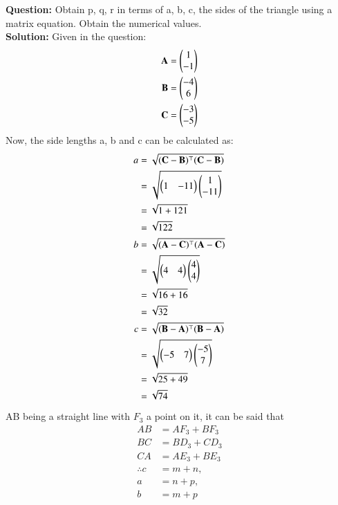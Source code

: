 \documentclass[journal,12pt,twocolumn]{IEEEtran}
\theoremstyle{remark}
\begin{document}
%
\textbf{Question:}
Obtain p, q, r in terms of a, b, c, the sides of the triangle using a matrix
equation. Obtain the numerical values.\\
\fi
\textbf{Solution:}
Given in the question:
\begin{align}
    \mathbf{A} &= \begin{pmatrix} 1 \\ -1 \end{pmatrix}\\
    \mathbf{B} &= \begin{pmatrix} -4 \\ 6 \end{pmatrix}\\
    \mathbf{C} &= \begin{pmatrix} -3 \\ -5 \end{pmatrix} 
\end{align}
Now, the side lengths a, b and c can be calculated as:
\begin{align}
    a &= \sqrt{(\mathbf{C}-\mathbf{B})^{\top}(\mathbf{C}-\mathbf{B})}\\
    &= \sqrt{\begin{pmatrix}1&-11\end{pmatrix} \begin{pmatrix}1\\-11\end{pmatrix}}\\
    &= \sqrt{1+121}\\
    &=\sqrt{122}    \\
    b &= \sqrt{(\mathbf{A}-\mathbf{C})^{\top}(\mathbf{A}-\mathbf{C})}\\
    &= \sqrt{\begin{pmatrix}4&4\end{pmatrix} \begin{pmatrix}4\\4\end{pmatrix}}\\
    &= \sqrt{16+16}\\
    &=\sqrt{32}     \\
    c &= \sqrt{(\mathbf{B}-\mathbf{A})^{\top}(\mathbf{B}-\mathbf{A})}\\
    &= \sqrt{\begin{pmatrix}-5&7\end{pmatrix} \begin{pmatrix}-5\\7\end{pmatrix}}\\
    &= \sqrt{25+49}\\
    &=\sqrt{74}
\end{align}
AB being a straight line with $F_3$ a point on it, it can be said that
\begin{align}
    AB &= AF_3 + BF_3\\
    BC &= BD_3 + CD_3\\
    CA &= AE_3 + BE_3\\
% 
    \therefore 
    c &= m+n,\\
    a &= n+p, \\
    b &= m+p 
\end{align}
\end{document}
